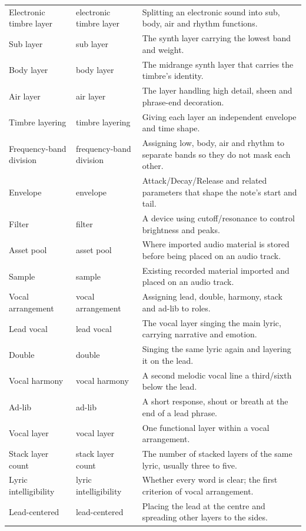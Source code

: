 \begin{longtable}{p{}p{}p{}}
Electronic timbre layer & electronic timbre layer & Splitting an electronic sound into sub, body, air and rhythm functions. \\
Sub layer & sub layer & The synth layer carrying the lowest band and weight. \\
Body layer & body layer & The midrange synth layer that carries the timbre's identity. \\
Air layer & air layer & The layer handling high detail, sheen and phrase-end decoration. \\
Timbre layering & timbre layering & Giving each layer an independent envelope and time shape. \\
Frequency-band division & frequency-band division & Assigning low, body, air and rhythm to separate bands so they do not mask each other. \\
Envelope & envelope & Attack/Decay/Release and related parameters that shape the note's start and tail. \\
Filter & filter & A device using cutoff/resonance to control brightness and peaks. \\
Asset pool & asset pool & Where imported audio material is stored before being placed on an audio track. \\
Sample & sample & Existing recorded material imported and placed on an audio track. \\
Vocal arrangement & vocal arrangement & Assigning lead, double, harmony, stack and ad-lib to roles. \\
Lead vocal & lead vocal & The vocal layer singing the main lyric, carrying narrative and emotion. \\
Double & double & Singing the same lyric again and layering it on the lead. \\
Vocal harmony & vocal harmony & A second melodic vocal line a third/sixth below the lead. \\
Ad-lib & ad-lib & A short response, shout or breath at the end of a lead phrase. \\
Vocal layer & vocal layer & One functional layer within a vocal arrangement. \\
Stack layer count & stack layer count & The number of stacked layers of the same lyric, usually three to five. \\
Lyric intelligibility & lyric intelligibility & Whether every word is clear; the first criterion of vocal arrangement. \\
Lead-centered & lead-centered & Placing the lead at the centre and spreading other layers to the sides. \\

\end{longtable}
